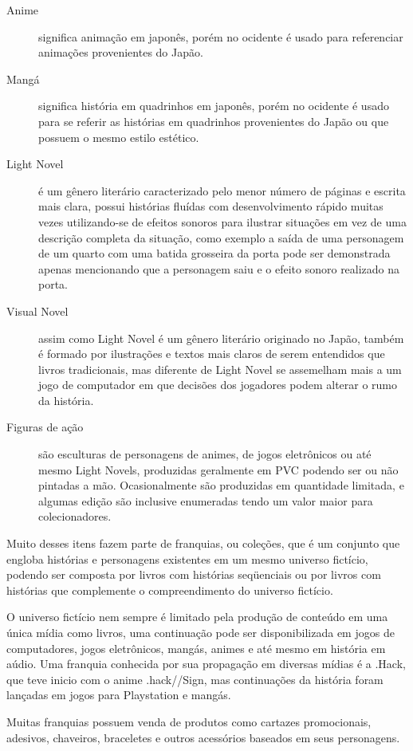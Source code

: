 \documentclass[12pt]{article}
\begin{document}
\begin{description}
\item[Anime] significa animação em japonês, porém no ocidente é usado para referenciar animações provenientes do Japão.
\item[Mangá] significa história em quadrinhos em japonês, porém no ocidente é usado para se referir as histórias em quadrinhos provenientes do Japão ou que possuem o mesmo estilo estético.
\item[Light Novel] é um gênero literário caracterizado pelo menor número de páginas e escrita mais clara, possui histórias fluídas com desenvolvimento rápido muitas vezes utilizando-se de efeitos sonoros para ilustrar situações em vez de uma descrição completa da situação, como exemplo a saída de uma personagem de um quarto com uma batida grosseira da porta pode ser demonstrada apenas mencionando que a personagem saiu e o efeito sonoro realizado na porta.
\item[Visual Novel] assim como Light Novel é um gênero literário originado no Japão, também é formado por ilustrações e textos mais claros de serem entendidos que livros tradicionais, mas diferente de Light Novel se assemelham mais a um jogo de computador em que decisões dos jogadores podem alterar o rumo da história.
\item[Figuras de ação] são esculturas de personagens de animes, de jogos eletrônicos ou até mesmo Light Novels, produzidas geralmente em PVC podendo ser ou não pintadas a mão. Ocasionalmente são produzidas em quantidade limitada, e algumas edição são inclusive enumeradas tendo um valor maior para colecionadores.
\end{description}


Muito desses itens fazem parte de franquias, ou coleções, que é um conjunto que engloba histórias e personagens existentes em um mesmo universo fictício, podendo ser composta por livros com histórias seqüenciais ou por livros com histórias que complemente o compreendimento do universo fictício. 

O universo fictício nem sempre é limitado pela produção de conteúdo em uma única mídia como livros, uma continuação pode ser disponibilizada em jogos de computadores, jogos eletrônicos, mangás, animes e até mesmo em história em aúdio. Uma franquia conhecida por sua propagação em diversas mídias é a .Hack, que teve inicio com o anime .hack//Sign, mas continuações da história foram lançadas em jogos para Playstation e mangás. 

Muitas franquias possuem venda de produtos como cartazes promocionais, adesivos, chaveiros, braceletes e outros acessórios baseados em seus personagens.
\end{document}
